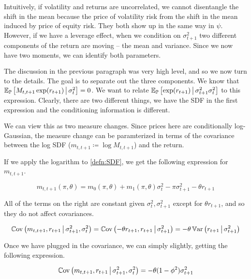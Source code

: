 \documentclass[11pt, letterpaper, twoside, final]{article}
\begin{document}
Intuitively, if volatility and returns are uncorrelated, we cannot disentangle the shift in the mean because the
price of volatility risk from the shift in the mean induced by price of equity risk.
They both show up in the same way in $\psi$.
However, if we have a leverage effect, when we condition on $\sigma^2_{t+1}$ two different components of the
return are moving -- the mean and variance.
Since we now have two moments, we can identify both parameters.

The discussion in the previous paragraph was very high level, and so we now turn to the details.
The goal is to separate out the three components.
We know that $\operatorname{\mathbb{E}}_{\mathbb{P}}\left[M_{t,t+1} \exp(r_{t+1}) \,\middle\vert\, \sigma^2_t \right] = 0$.
We want to relate $\operatorname{\mathbb{E}}_{\mathbb{P}}\left[\exp(r_{t+1}) \,\middle\vert\, \sigma^2_{t+1} \sigma^2_t \right]$  to this expression.
Clearly, there are two different things, we have the SDF in the first expression and the conditioning information
is different.

We can view this as two measure changes.
Since prices here are conditionally log-Gaussian, the measure change  can be paramterized in terms of the
covariance between the log SDF ($m_{t,t+1} \coloneqq \log M_{t,t+1}$) and the return.

If we apply the logarithm to \cref{defn:SDF}, we get the following expression for $m_{t,t+1}$.

\begin{equation}
        m_{t,t+1}(\pi, \theta) = m_{0}(\pi, \theta) + m_1(\pi, \theta) \sigma_t^2 - \pi \sigma^2_{t+1} - \theta
        r_{t+1}
\end{equation}

All of the terms on the right are constant given $\sigma^2_t, \sigma^2_{t+1}$ except for $\theta r_{t+1}$, and so
they do not affect covariances.

\begin{equation}
    \Cov\left(m_{t,t+1}, r_{t+1} \mvert \sigma^2_{t+1}, \sigma^2_t \right)   
%
    = \Cov\left(-\theta r_{t+1}, r_{t+1} \mvert \sigma^2_{t+1}\right)   
%
    = -\theta \Var\left(r_{t+1} \mvert \sigma^2_{t+1}\right)   
\end{equation}

Once we have plugged in the covariance, we can simply slightly, getting the following expression.

\begin{equation}
    \label{eqn:return_covarinace}
    \Cov\left(m_{t,t+1}, r_{t+1} \mvert \sigma^2_{t+1}, \sigma^2_t \right)   
%
    = -\theta (1 - \phi^2) \sigma^2_{t+1} 
\end{equation}
\end{document}
